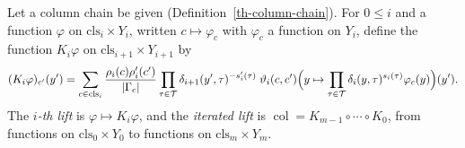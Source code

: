 \begin{definition}\label{th-iterated-lift}
Let a column chain be given (Definition~\ref{th-column-chain}). For
$0\leq i$ and a function $\varphi$ on $\mathrm{cls}_i\times Y_i$, written
$c\mapsto\varphi_c$ with $\varphi_c$ a function on $Y_i$, define the
function $K_i\varphi$ on $\mathrm{cls}_{i+1}\times Y_{i+1}$ by
\[
(K_i\varphi)_{c'}(y')=\sum_{c\in\mathrm{cls}_i}\frac{\rho_i(c)\rho'_i(c')}{|\Gamma_c|}
\prod_{\tau\in\mathcal T}\delta_{i+1}(y',\tau)^{-s'_i(\tau)}\;
\vartheta_i(c,c')\Bigl(y\mapsto\prod_{\tau\in\mathcal T}\delta_i(y,\tau)^{s_i(\tau)}\varphi_c(y)\Bigr)(y').
\]
The \emph{$i$-th lift} is $\varphi\mapsto K_i\varphi$, and the
\emph{iterated lift} is $\operatorname{col}=K_{m-1}\circ\cdots\circ K_0$,
from functions on $\mathrm{cls}_0\times Y_0$ to functions on
$\mathrm{cls}_m\times Y_m$.
\end{definition}

